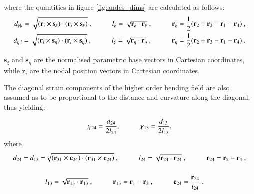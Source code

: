 where the quantities in figure \ref{fig:andes_dims} are calculated as follows:
\begin{align*} 
	d_{\xi | i} = \sqrt{(\mathbf{r}_i \times \mathbf{s_\xi}) \cdot (\mathbf{r}_i \times \mathbf{s_\xi})}\ ,
	\hspace{10mm}
	l_\xi = \sqrt{\mathbf{r_\xi} \cdot \mathbf{r_\xi}}\ ,
	\hspace{10mm} 
	\mathbf{r_\xi} = \frac{1}{2} ( \mathbf{r}_2 + \mathbf{r}_3 - \mathbf{r}_1 - \mathbf{r}_4 )\ , \\
	d_{\eta | i} = \sqrt{(\mathbf{r}_i \times \mathbf{s_\eta}) \cdot (\mathbf{r}_i \times \mathbf{s_\eta})}\ ,
	\hspace{10mm}
	l_\xi = \sqrt{\mathbf{r_\eta} \cdot \mathbf{r_\eta}}\ ,
	\hspace{10mm}
	\mathbf{r_\eta} = \frac{1}{2} ( \mathbf{r}_2 + \mathbf{r}_3 - \mathbf{r}_1 - \mathbf{r}_4 )\ .
\end{align*}

$\mathbf{s}_\xi$ and $\mathbf{s}_\eta$ are the normalised parametric base vectors in Cartesian coordinates, while $\mathbf{r}_i$ are the nodal position vectors in Cartesian coordinates.

The diagonal strain components of the higher order bending field are also assumed as to be proportional to the distance and curvature along the diagonal, thus yielding:  

\begin{equation} 
\chi_{24} = \frac{d_{24}}{2 l_{24}},
\hspace{10mm}
\chi_{13} = \frac{d_{13}}{2 l_{13}},
\label{equation12chi24}
\end{equation}
where
\begin{align*} 
\begin{split}
	d_{24} = d_{13} = & \sqrt{(\mathbf{r}_{31} \times \mathbf{e}_{24}) \cdot (\mathbf{r}_{31} \times \mathbf{e}_{24})}\ ,
	\hspace{10mm}
	l_{24} = \sqrt{\mathbf{r}_{24} \cdot \mathbf{r}_{24}}\ ,
	\hspace{10mm}
	\mathbf{r}_{24} = \mathbf{r}_2 - \mathbf{r}_4\ ,
	\\
	\\
	& l_{13} = \sqrt{\mathbf{r}_{13} \cdot \mathbf{r}_{13}}\ ,
	\hspace{10mm}
	\mathbf{r}_{13} = \mathbf{r}_1 - \mathbf{r}_3\ ,
	\hspace{10mm}
	\mathbf{e}_{24} = \frac{\mathbf{r}_{24}}{l_{24}}\ .
	\end{split}
\end{align*}

